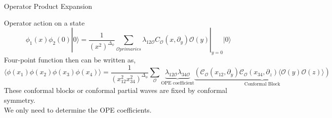 \documentclass[pdf]{beamer}
\begin{document}
                \begin{frame}[t]{Operator Product Expansion}
                    
                         Operator action on a state 
                        \small
                        \begin{equation*}
                            \phi_1(x)\phi_2(0)|0\rangle = \frac{1}{(x^2)^{\Delta_{\phi}}}\sum_{\mathcal{O} primaries} \lambda_{12\mathcal{O}}C_{\mathcal{O}}(x,\partial_y)\mathcal{O}(y)|_{y=0}|0\rangle
                        \end{equation*}
                        \normalsize
                            Four-point function then can be written as,
                        \scriptsize
                        \begin{equation*}
                            \langle\phi(x_1)\phi(x_2)\phi(x_3)\phi(x_4)\rangle = \frac{1}{(x_{12}^{2}x_{34}^{2})^{\Delta_{\phi}}}\sum_{\mathcal{O}}\underbrace{\lambda_{12\mathcal{O}}\lambda_{34\mathcal{O}}}_{\text{OPE coefficient}}\underbrace{\left(\mathcal{C}_{\mathcal{O}}(x_{12},\partial_y)\mathcal{C}_{\mathcal{O}}(x_{34},\partial_z)\langle\mathcal{O}(y)\mathcal{O}(z) \rangle \right)}_{\text{Conformal Block}}
                        \end{equation*} 
                        \normalsize
                         These conformal blocks or conformal partial waves are fixed by conformal symmetry. \\
                         We only need to determine the OPE coefficients.
                \end{frame}
\end{document}
